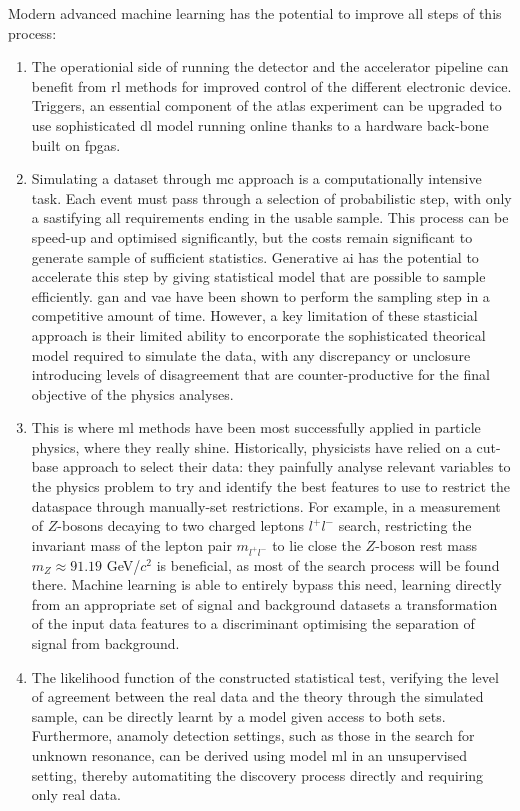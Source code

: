 Modern advanced machine learning has the potential to improve all steps of this process:
\begin{enumerate}
    \item The operationial side of running the detector and the accelerator pipeline can benefit from \gls{rl} methods for improved control of the different electronic device. Triggers, an essential component of the \gls{atlas} experiment can be upgraded to use sophisticated \gls{dl} model running online thanks to a hardware back-bone built on \gls{fpga}s.
    \item Simulating a dataset through \gls{mc} approach is a computationally intensive task. Each event must pass through a selection of probabilistic step, with only a sastifying all requirements ending in the usable sample. This process can be speed-up and optimised significantly, but the costs remain significant to generate sample of sufficient statistics. Generative \gls{ai} has the potential to accelerate this step by giving statistical model that are possible to sample efficiently. \gls{gan} and \gls{vae} have been shown to perform the sampling step in a competitive amount of time. However, a key limitation of these stasticial approach is their limited ability to encorporate the sophisticated theorical model required to simulate the data, with any discrepancy or unclosure introducing levels of disagreement that are counter-productive for the final objective of the physics analyses.
    \item This is where \gls{ml} methods have been most successfully applied in particle physics, where they really shine. Historically, physicists have relied on a cut-base approach to select their data: they painfully analyse relevant variables to the physics problem to try and identify the best features to use to restrict the dataspace through manually-set restrictions. For example, in a measurement of $Z$-bosons decaying to two charged leptons $l^+l^-$ search, restricting the invariant mass of the lepton pair $m_{l^+l^-}$ to lie close the $Z$-boson rest mass $m_Z \approx 91.19$ GeV/$c^2$ is beneficial, as most of the search process will be found there. Machine learning is able to entirely bypass this need, learning directly from an appropriate set of signal and background datasets a transformation of the input data features to a discriminant optimising the separation of signal from background. 
    \item The likelihood function of the constructed statistical test, verifying the level of agreement between the real data and the theory through the simulated sample, can be directly learnt by a model given access to both sets. Furthermore, anamoly detection settings, such as those in the search for unknown resonance, can be derived using model \gls{ml} in an unsupervised setting, thereby automatiting the discovery process directly and requiring only real data. 
\end{enumerate}

